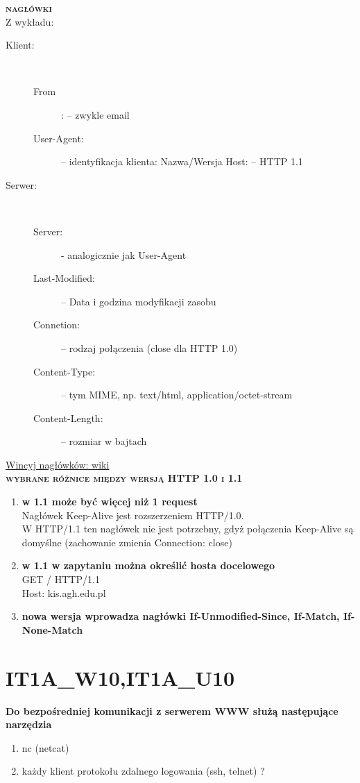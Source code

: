 \textsc{\textbf{nagłówki}}\\
Z wykładu:
\begin{description}

\item[Klient:] \hfill \\
	\begin{description}
	\item[From]: – zwykle email
	\item[User-Agent:] – identyfikacja klienta: Nazwa/Wersja Host: – HTTP 1.1
	\end{description}
\item[Serwer:] \hfill \\
	\begin{description}
		\item[Server:] - analogicznie jak User-Agent
		\item[Last-Modified:] – Data i godzina modyfikacji zasobu 
		\item[Connetion:] – rodzaj połączenia (close dla HTTP 1.0)
		\item[Content-Type:] – tym MIME, np. text/html, application/octet-stream
		\item[Content-Length:] – rozmiar w bajtach
	\end{description}
\end{description}
\href{http://www.wikiwand.com/pl/Lista_nag%C5%82%C3%B3wk%C3%B3w_HTTP}{Wincyj nagłówków: wiki} 
\\


\textsc{\textbf{wybrane różnice między wersją HTTP 1.0 i 1.1}}
\begin{enumerate}
\item{\textbf{ w 1.1 może być więcej niż 1 request}\\
Nagłówek Keep-Alive jest rozszerzeniem HTTP/1.0. \\
W HTTP/1.1 ten nagłówek nie jest potrzebny, gdyż połączenia Keep-Alive są domyślne (zachowanie zmienia Connection: close)}
\item{\textbf{w  1.1 w zapytaniu można określić hosta docelowego}\\
GET / HTTP/1.1 \\
Host: kis.agh.edu.pl}
\item{\textbf{nowa wersja wprowadza nagłówki If-Unmodified-Since, If-Match, If-None-Match}}

\end{enumerate}






\section{IT1A\_W10,IT1A\_U10}
\textbf{Do bezpośredniej komunikacji z serwerem WWW służą następujące narzędzia}
\vspace{0.4cm}
\noindent
 \begin{enumerate}
 \item{nc (netcat)} 
 \item{każdy klient protokołu zdalnego logowania (ssh, telnet) ?}
 \end{enumerate}
 
